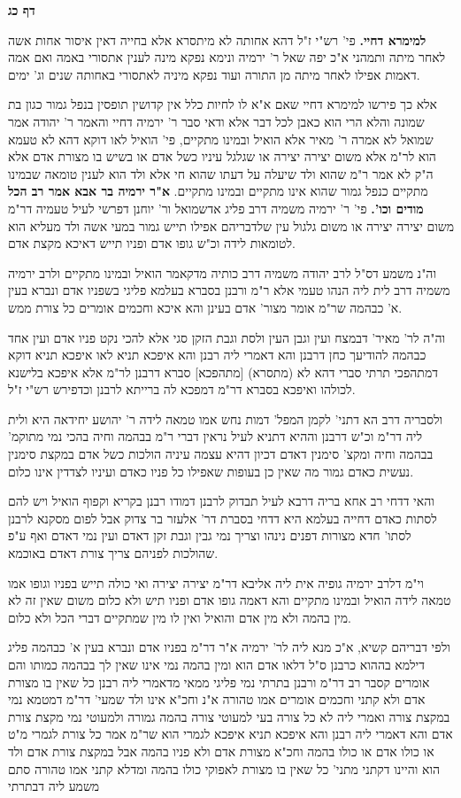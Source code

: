\documentclass[12pt, openany]{book}
\newcommand{\sethebfont}{
\fontsize{10.5pt}{21.0pt} \selectfont
}
\newcommand{\twocol}[1]{
	{\sethebfont \begin{multicols}{2}
			#1
	\end{multicols}}	
}
\newcommand{\sectname}{}
\newcommand{\newsection}[1]{
	\addcontentsline{toc}{section}{#1}
	\renewcommand{\sectname}{#1}	
	\vspace{-\baselineskip}
	\begin{center}
		\textbf{%
\fontsize{16pt}{16pt}\selectfont
			#1}
	\end{center}
	\vspace{-\baselineskip}
	\nopagebreak
}
\begin{document}
\newsection{דף כג}
\twocol{\textbf{למימרא דחיי.}  פי' רש"י ז"ל דהא אחותה לא מיתסרא אלא בחייה דאין איסור אחות אשה לאחר מיתה ותמהני א"כ יפה שאל ר' ירמיה ונימא נפקא מינה לענין אתסורי באמה ואם אמה דאמות אפילו לאחר מיתה מן התורה ועוד נפקא מיניה לאתסורי באחותה שנים וג' ימים.\par  אלא כך פירשו למימרא דחיי שאם א"א לו לחיות כלל אין קדושין תופסין בנפל גמור כגון בת שמונה והלא הרי הוא כאבן לכל דבר אלא ודאי סבר ר' ירמיה דחיי והאמר ר' יהודה אמר שמואל לא אמרה ר' מאיר אלא הואיל ובמינו מתקיים, פי' הואיל לאו דוקא דהא לא טעמא הוא לר"מ אלא משום יצירה יצירה או שגלגל עיניו כשל אדם או בשיש בו מצורת אדם אלא ה"ק לא אמר ר"מ שהוא ולד שיעלה על דעתו שהוא חי אלא ולד הוא לענין טומאה שבמינו מתקיים כנפל גמור שהוא אינו מתקיים ובמינו מתקיים. 
\textbf{א"ר ירמיה בר אבא אמר רב הכל מודים וכו'.}  פי' ר' ירמיה משמיה דרב פליג אדשמואל ור' יוחנן דפרשי לעיל טעמיה דר"מ משום יצירה יצירה או משום גלגול עין שלדבריהם אפילו תייש גמור במעי אשה ולד מעליא הוא לטומאות לידה וכ"ש גופו אדם ופניו תייש דאיכא מקצת אדם.\par  וה"נ משמע דס"ל לרב יהודה משמיה דרב כותיה מדקאמר הואיל ובמינו מתקיים ולרב ירמיה משמיה דרב לית ליה הנהו טעמי אלא ר"מ ורבנן בסברא בעלמא פליגי בשפניו אדם ונברא בעין א' כבהמה שר"מ אומר מצור' אדם בעינן והא איכא וחכמים אומרים כל צורת ממש.\par  וה"ה לר' מאיר' דבמצח ועין וגבן העין ולסת וגבת הזקן סגי אלא להכי נקט פניו אדם ועין אחד כבהמה להודיעך כחן דרבנן והא דאמרי ליה רבנן והא איפכא תניא לאו איפכא תניא דוקא דמתהפכי תרתי סברי דהא לא (מתסרא) [מתהפכא] סברא דרבנן לר"מ אלא איפכא בלישנא לכולהו ואיפכא בסברא דר"מ דמפכא לה ברייתא לרבנן וכדפירש רש"י ז"ל.\par ולסבריה דרב הא דתני' לקמן המפל' דמות נחש אמו טמאה לידה ר' יהושע יחידאה היא ולית ליה דר"מ וכ"ש דרבנן וההיא דתניא לעיל נראין דברי ר"מ בבהמה וחיה בהכי נמי מתוקמ' בבהמה וחיה ומקצ' סימנין דאדם דכיון דהיא עצמה עיניה הולכות כשל אדם במקצת סימנין נעשית כאדם גמור מה שאין כן בעופות שאפילו כל פניו כאדם ועיניו לצדדין אינו כלום.\par  והאי דדחי רב אחא בריה דרבא לעיל תבדוק לרבנן דמודו רבנן בקריא וקפוף הואיל ויש להם לסתות כאדם דחייה בעלמא היא דדחי בסברת דר' אלעזר בר צדוק אבל לפום מסקנא לרבנן לסתו' חדא מצורות דפנים נינהו וצריך נמי גבין וגבת זקן דאדם ועין נמי דאדם ואף ע"פ שהולכות לפניהם צריך צורת דאדם באוכמא.\par  וי"מ דלרב ירמיה גופיה אית ליה אליבא דר"מ יצירה יצירה ואי כולה תייש בפניו וגופו אמו טמאה לידה הואיל ובמינו מתקיים והא דאמה גופו אדם ופניו תיש ולא כלום משום שאין זה לא מין בהמה ולא מין אדם והואיל ואין לו מין שמתקיים דברי הכל ולא כלום.\par  ולפי דבריהם קשיא, א"כ מנא ליה לר' ירמיה א"ר דר"מ בפניו אדם ונברא בעין א' כבהמה פליג דילמא בההוא כרבנן ס"ל דלאו אדם הוא ומין בהמה נמי אינו שאין לך בבהמה כמותו והם אומרים קסבר רב דר"מ ורבנן בתרתי נמי פליגי ממאי מדאמרי ליה רבנן כל שאין בו מצורת אדם ולא קתני וחכמים אומרים אמו טהורה א"נ וחכ"א אינו ולד שמעי' דר"מ דמטמא נמי במקצת צורה ואמרי ליה לא כל צורה בעי למעוטי צורה בהמה גמורה ולמעוטי נמי מקצת צורת אדם והא דאמרי ליה רבנן והא איפכא תניא איפכא לגמרי הוא שר"מ אמר כל צורת לגמרי מ"ט או כולו אדם או כולו בהמה וחכ"א מצורת אדם ולא פניו בהמה אבל במקצת צורת אדם ולד הוא והיינו דקתני מתני' כל שאין בו מצורת לאפוקי כולו בהמה ומדלא קתני אמו טהורה סתם משמע ליה דבתרתי }
\end{document}
